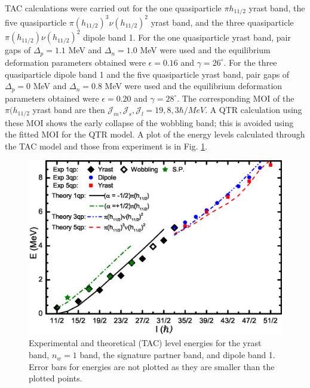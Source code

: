 TAC calculations were carried out for the one quasiparticle $\pi{}h_{11/2}$ yrast band,
{\justifying{} the five quasiparticle $\pi(h_{11/2})^3\nu(h_{11/2})^2$ yrast band, and the three quasiparticle}\\
$\pi(h_{11/2})\nu(h_{11/2})^2$ dipole band 1. For the one quasiparticle yrast band, pair gaps of $\Delta_p=1.1$ MeV and $\Delta_n=1.0$ MeV were used and the equilibrium deformation parameters obtained were $\epsilon=0.16$ and $\gamma=26^{\circ}$. For the three quasiparticle dipole band 1 and the five quasiparticle yrast band, pair gaps of $\Delta_p=0$ MeV and $\Delta_n=0.8$ MeV were used and the equilibrium deformation parameters obtained were $\epsilon=0.20$ and $\gamma=28^{\circ}$. The corresponding MOI of the $\pi(h_{11/2}$ yrast band are then $\mathcal{J}_m,\mathcal{J}_s,\mathcal{J}_l = 19, 8, 3 \hbar{}/MeV$. A QTR calculation using these MOI shows the early collapse of the wobbling band; this is avoided using the fitted MOI for the QTR model. A plot of the energy levels calculated through the TAC model and those from experiment is in Fig. \ref{fig:chp4-TAC-en}.

\begin{figure}[t!]
\centerline{\includegraphics[width=\textwidth]{./img/c4/evj_new_yrast.eps}}
	\caption{Experimental and theoretical (TAC) level energies for the yrast band, $n_w=1$ band, the signature partner band, and dipole band 1. Error bars for energies are not plotted as they are smaller than the plotted points.\label{fig:chp4-TAC-en}}
\end{figure}

